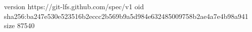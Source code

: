 version https://git-lfs.github.com/spec/v1
oid sha256:ba247e530e523516b2eccc2b569b9a5d984e632485009758b2ae4a7e4b98a941
size 87540
